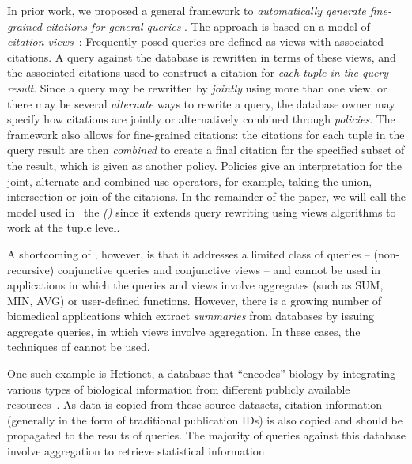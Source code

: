 In prior work, we proposed a general framework to {\em automatically generate fine-grained citations for general queries} \cite{alawini2017automating,wu2018data}.
The approach is based on a model of {\em citation views}~\cite{BunemanEtAl2016,davidson2017model,DBLP:conf/pods/DavidsonBDMS17}: Frequently posed queries  are defined as views with associated citations. A query against the database is rewritten in terms of these views, and the associated citations used to construct a citation for \textit{each tuple in the query result}. Since a query may be rewritten by \textit{jointly} using more than one view, or there may be several \textit{alternate} ways to rewrite a query, the database owner may specify how citations are jointly or alternatively combined through \textit{policies}.  The framework also allows for fine-grained citations: the citations for each tuple in the query result are then \textit{combined} to create a final citation for the specified subset of the result, which is given as another policy.  Policies give an interpretation for the joint, alternate and combined use operators, for example, taking the union, intersection or join of the citations.  In the remainder of the paper, we will call the model used in~\cite{wu2018data} the {\em {\rbafull} (\rba)} since it  extends query rewriting using views algorithms to work at the tuple level.

A shortcoming of {\rba}, however, is that it addresses a limited class of queries -- (non-recursive) conjunctive queries and conjunctive views -- and cannot be used in applications in which the queries and views involve aggregates (such as SUM, MIN, AVG) or user-defined functions.  However, there is a growing number of biomedical applications which extract \textit{summaries} from data\-bases by issuing aggregate queries, in which views involve aggregation. In these cases, the techniques of \cite{wu2018data} cannot be used.


One such example is Hetionet, a database that ``encodes'' biology by integrating various types of biological information from different publicly available resources~\cite{himmelstein2015heterogeneous, himmelstein2017systematic}.
As data is copied from these source datasets, citation information (generally in the form of traditional publication IDs) is also copied and should be propagated to the results of queries.
The majority of queries against this database involve aggregation to retrieve statistical information.

